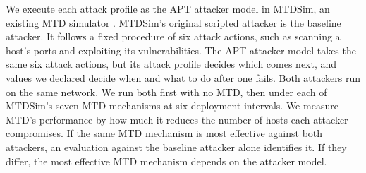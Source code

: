 \documentclass{cshonours}
\begin{document}
We execute each attack profile as the APT attacker model in MTDSim, an existing MTD simulator
\citep{brown2023}. MTDSim's original scripted
attacker is the baseline attacker. It follows a fixed procedure of six attack
actions, such as scanning a host's ports and exploiting its vulnerabilities.
The APT attacker model takes the same six attack actions, but its attack
profile decides which comes next, and values we declared decide when and what
to do after one fails. Both
attackers run on the same network. We run both first with no MTD, then under each of MTDSim's seven MTD mechanisms at six deployment intervals. We measure MTD's performance by how much it reduces
the number of hosts each attacker compromises.
If the same MTD mechanism is most effective against both attackers, an
evaluation against the baseline attacker alone identifies it. If they differ,
the most effective MTD mechanism depends on the attacker model.
\end{document}
